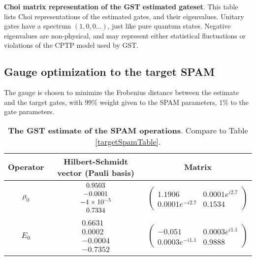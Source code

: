 {\begin{table}[h]
\begin{center}
\caption{\textbf{Choi matrix representation of the GST estimated gateset}.  This table lists Choi representations of the estimated gates, and their eigenvalues.  Unitary gates have a spectrum $(1,0,0\ldots)$, just like pure quantum states.  Negative eigenvalues are non-physical, and may represent either statistical fluctuations or violations of the CPTP model used by GST.\label{bestTargetGatesetChoiTable}}
\end{center}
\end{table}


\clearpage

\subsection{Gauge optimization to the target SPAM}
The gauge is chosen to minimize the Frobenius distance between the estimate and the target gates, with 99\% weight given to the SPAM parameters, 1\% to the gate parameters.

\begin{table}[h]
\begin{center}
\begin{tabular}[l]{|c|c|c|}
\hline
Operator & Hilbert-Schmidt vector (Pauli basis) & Matrix \\ \hline
$\rho_{0}$ & $ \begin{array}{c}
0.9503 \\ 
-0.0001 \\ 
-4\times 10^{-5} \\ 
0.7334
 \end{array} $
 & $ \left(\!\!\begin{array}{cc}
1.1906 & 0.0001e^{i2.7} \\ 
0.0001e^{-i2.7} & 0.1534
 \end{array}\!\!\right) $
 \\ \hline
$E_{0}$ & $ \begin{array}{c}
0.6631 \\ 
0.0002 \\ 
-0.0004 \\ 
-0.7352
 \end{array} $
 & $ \left(\!\!\begin{array}{cc}
-0.051 & 0.0003e^{i1.1} \\ 
0.0003e^{-i1.1} & 0.9888
 \end{array}\!\!\right) $
 \\ \hline
\end{tabular}

\caption{\textbf{The GST estimate of the SPAM operations}.  Compare to Table \ref{targetSpamTable}.\label{bestTargetSpamGatesetSpamTable}}
\end{center}
\end{table}

}
